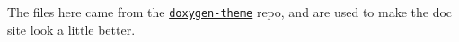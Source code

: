 The files here came from the \href{https://github.com/nnen/doxygen-theme/tree/46111c61a9f49b7a9886127e679d4317478fab1c}{\tt doxygen-\/theme} repo, and are used to make the doc site look a little better. 